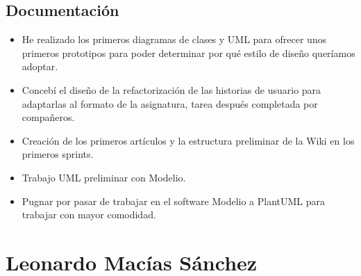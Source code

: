 \documentclass[../FINAL/Scrum/SCRUM.tex]{subfiles}
\begin{document}
\subsection*{Documentación}
\begin{itemize}
\item He realizado los primeros diagramas de clases y UML para ofrecer unos primeros prototipos para poder determinar por qué estilo de diseño queríamos adoptar.
\item Concebí el diseño de la refactorización de las historias de usuario para adaptarlas al formato de la asignatura, tarea después completada por compañeros.
\item Creación de los primeros artículos y la estructura preliminar de la Wiki en los primeros sprints.
\item Trabajo UML preliminar con Modelio.
\item Pugnar por pasar de trabajar en el software Modelio a PlantUML para trabajar con mayor comodidad.
\end{itemize}

\section{Leonardo Macías Sánchez}
\end{document}
